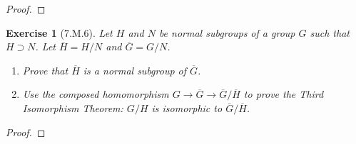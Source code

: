 \documentclass[12pt]{article}
\newtheorem*{exer}{Exercise}
\begin{document}
\begin{proof}

\end{proof}


\begin{exer}[7.M.6]

    Let $H$ and $N$ be normal subgroups of a group $G$ such that $H
    \supset N$. Let $\overline{H} = H/N$ and $\overline{G} = G/N$.

    \begin{enumerate}
        \item Prove that $\overline{H}$ is a normal subgroup of
            $\overline{G}$. 
        \item Use the composed homomorphism $G \rightarrow \overline{G}
            \rightarrow \overline{G}/\overline{H}$ to prove the
            \textit{Third Isomorphism Theorem}: $G/H$ is isomorphic to
            $\overline{G} / \overline{H}$.
            
    \end{enumerate}

\end{exer}

\begin{proof}

\end{proof}
\end{document}
